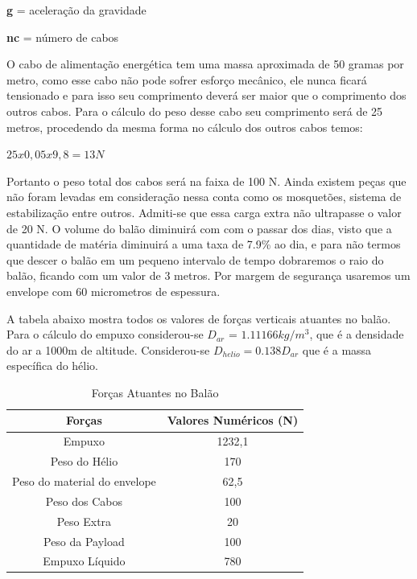 \textbf{g} =  aceleração da gravidade

\textbf{nc} = número de cabos

O cabo de alimentação energética tem uma massa aproximada de 50 gramas por metro, como esse cabo não pode sofrer esforço mecânico, ele nunca  ficará tensionado e para isso seu comprimento deverá ser maior que o comprimento dos outros cabos. Para o cálculo do peso desse cabo seu comprimento será de 25 metros, procedendo da mesma forma no cálculo dos outros cabos temos:

$25 x 0,05x 9,8 = 13 N$

Portanto o peso total dos cabos será na faixa de 100 N.
Ainda existem peças que não foram levadas em consideração nessa conta como os mosquetões, sistema de estabilização entre outros. Admiti-se que essa carga extra não ultrapasse o valor de 20 N.
O volume do balão diminuirá com com o passar dos dias, visto que a quantidade de matéria diminuirá a uma taxa de 7.9\% ao dia, e para não termos que descer o balão em um pequeno intervalo de tempo dobraremos o raio do balão, ficando com um valor de 3 metros. Por margem de segurança usaremos um envelope com 60 micrometros de espessura.

A tabela abaixo mostra todos os valores de forças verticais atuantes no balão. Para o cálculo do empuxo considerou-se $D_{ar}$ = $1.11166 kg/m^3$, que é a densidade do ar a 1000m de altitude. Considerou-se $D_{helio} = 0.138 D_{ar}$ que é a massa específica do hélio.

\begin{table}[H]
	\centering
	\begin{tabular}{|c|c|}
		\hline
		\rowcolor[HTML]{FFFFFF}
		{\color[HTML]{000000} \textbf{Forças}} & {\color[HTML]{000000} \textbf{Valores Numéricos (N)}} \\ \hline
		Empuxo                                 & 1232,1                                                \\ \hline
		Peso do Hélio                          & 170                                                   \\ \hline
		Peso do material do envelope           & 62,5                                                  \\ \hline
		Peso dos Cabos                         & 100                                                   \\ \hline
		Peso Extra                             & 20                                                    \\ \hline
		Peso da Payload                        & 100                                                   \\ \hline
		Empuxo Líquido                         & 780                                                   \\ \hline
	\end{tabular}
	\caption{Forças Atuantes no Balão}
	\label{tab:forcasAtuantes}
\end{table}

